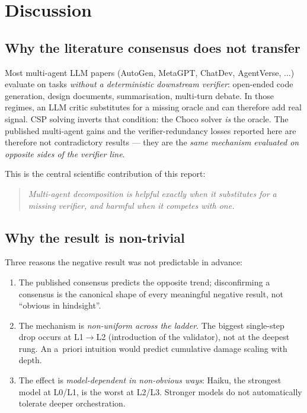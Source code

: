 \documentclass[11pt,a4paper]{article}
\begin{document}
\section{Discussion}

\subsection{Why the literature consensus does not transfer}
Most multi-agent LLM papers (AutoGen, MetaGPT, ChatDev, AgentVerse, $\dots$)
evaluate on tasks \emph{without a deterministic downstream verifier}:
open-ended code generation, design documents, summarisation, multi-turn
debate. In those regimes, an LLM critic substitutes for a missing oracle
and can therefore add real signal. CSP solving inverts that condition: the
Choco solver \emph{is} the oracle. The published multi-agent gains and the
verifier-redundancy losses reported here are therefore not contradictory
results --- they are the \emph{same mechanism evaluated on opposite sides
of the verifier line}.

This is the central scientific contribution of this report:

\begin{quote}\itshape
Multi-agent decomposition is helpful exactly when it substitutes for a
missing verifier, and harmful when it competes with one.
\end{quote}

\subsection{Why the result is non-trivial}
Three reasons the negative result was not predictable in advance:
\begin{enumerate}[leftmargin=1.2cm,itemsep=1pt,topsep=2pt]
\item The published consensus predicts the opposite trend; disconfirming a
consensus is the canonical shape of every meaningful negative result, not
``obvious in hindsight''.
\item The mechanism is \emph{non-uniform across the ladder}. The biggest
single-step drop occurs at L1$\to$L2 (introduction of the validator), not
at the deepest rung. An a~priori intuition would predict cumulative damage
scaling with depth.
\item The effect is \emph{model-dependent in non-obvious ways}: Haiku, the
strongest model at L0/L1, is the worst at L2/L3. Stronger models do not
automatically tolerate deeper orchestration.
\end{enumerate}
\end{document}

